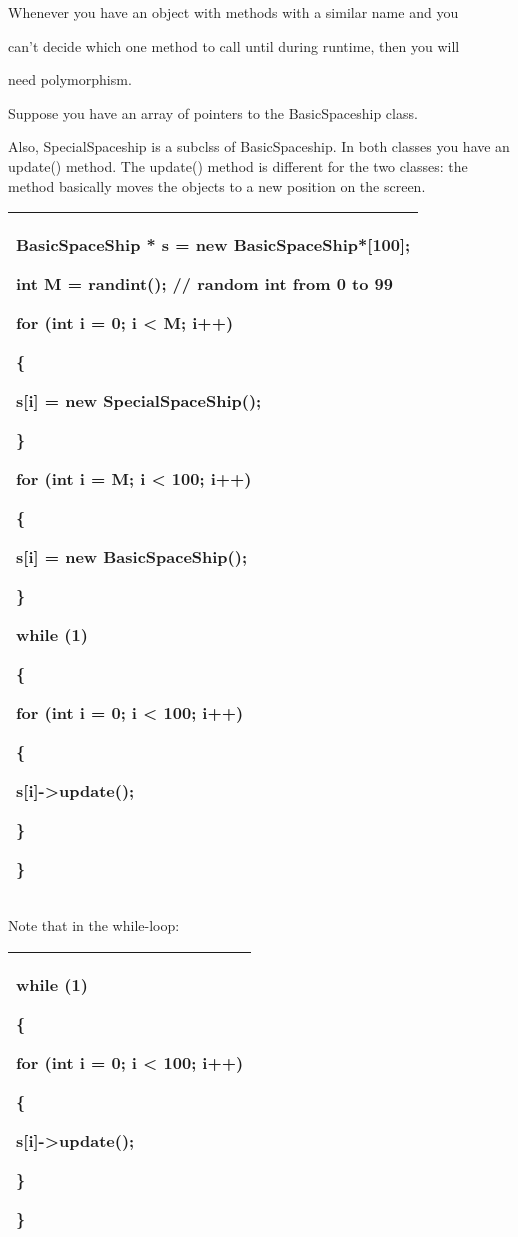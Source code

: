 \documentclass[
]{article}
\begin{document}
Whenever you have an object with methods with a similar name and you

can't decide which one method to call until during runtime, then you
will

need polymorphism.

Suppose you have an array of pointers to the BasicSpaceship class.

Also, SpecialSpaceship is a subclss of BasicSpaceship. In both classes
you have an update() method. The update() method is different for the
two classes: the method basically moves the objects to a new position on
the screen.

\begin{longtable}[]{@{}l@{}}
\toprule
\endhead
\begin{minipage}[t]{0.97\columnwidth}\raggedright
BasicSpaceShip * s = new BasicSpaceShip*{[}100{]};

int M = randint(); // random int from 0 to 99

for (int i = 0; i \textless{} M; i++)

\{

s{[}i{]} = new SpecialSpaceShip();

\}

for (int i = M; i \textless{} 100; i++)

\{

s{[}i{]} = new BasicSpaceShip();

\}

while (1)

\{

for (int i = 0; i \textless{} 100; i++)

\{

s{[}i{]}-\textgreater update();

\}

\}\strut
\end{minipage}\tabularnewline
\bottomrule
\end{longtable}

Note that in the while-loop:

\begin{longtable}[]{@{}l@{}}
\toprule
\endhead
\begin{minipage}[t]{0.97\columnwidth}\raggedright
while (1)

\{

for (int i = 0; i \textless{} 100; i++)

\{

s{[}i{]}-\textgreater update();

\}

\}\strut
\end{minipage}\tabularnewline
\bottomrule
\end{longtable}
\end{document}
